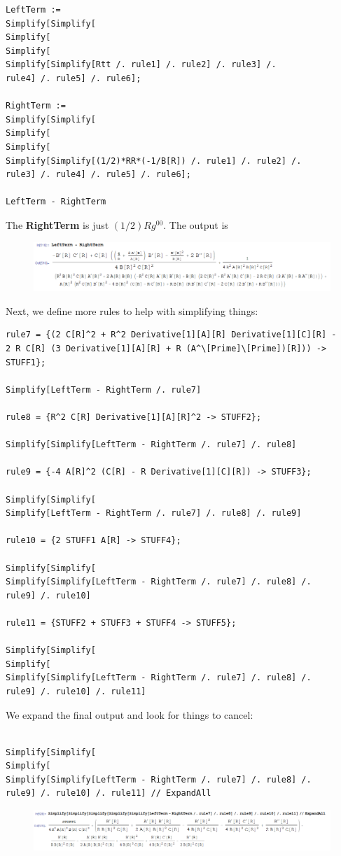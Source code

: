 \documentclass{book}
\theoremstyle{definition}
\begin{document}
\begin{lstlisting}
LeftTerm := 
Simplify[Simplify[
Simplify[
Simplify[
Simplify[Simplify[Rtt /. rule1] /. rule2] /. rule3] /. 
rule4] /. rule5] /. rule6];

RightTerm := 
Simplify[Simplify[
Simplify[
Simplify[
Simplify[Simplify[(1/2)*RR*(-1/B[R]) /. rule1] /. rule2] /. 
rule3] /. rule4] /. rule5] /. rule6];

LeftTerm - RightTerm
\end{lstlisting} 

The \textbf{RightTerm} is just $(1/2)Rg^{00}$. The output is
\begin{figure}[!htb]
	\centering
	\includegraphics[scale=0.3]{leftright}
\end{figure}

Next, we define more rules to help with simplifying things:
\begin{lstlisting}
rule7 = {(2 C[R]^2 + R^2 Derivative[1][A][R] Derivative[1][C][R] - 
2 R C[R] (3 Derivative[1][A][R] + R (A^\[Prime]\[Prime])[R])) ->
STUFF1};

Simplify[LeftTerm - RightTerm /. rule7]

rule8 = {R^2 C[R] Derivative[1][A][R]^2 -> STUFF2};

Simplify[Simplify[LeftTerm - RightTerm /. rule7] /. rule8]

rule9 = {-4 A[R]^2 (C[R] - R Derivative[1][C][R]) -> STUFF3};

Simplify[Simplify[
Simplify[LeftTerm - RightTerm /. rule7] /. rule8] /. rule9]

rule10 = {2 STUFF1 A[R] -> STUFF4};

Simplify[Simplify[
Simplify[Simplify[LeftTerm - RightTerm /. rule7] /. rule8] /. 
rule9] /. rule10]

rule11 = {STUFF2 + STUFF3 + STUFF4 -> STUFF5};

Simplify[Simplify[
Simplify[
Simplify[Simplify[LeftTerm - RightTerm /. rule7] /. rule8] /. 
rule9] /. rule10] /. rule11]
\end{lstlisting}


We expand the final output and look for things to cancel:
\begin{lstlisting}

Simplify[Simplify[
Simplify[
Simplify[Simplify[LeftTerm - RightTerm /. rule7] /. rule8] /. 
rule9] /. rule10] /. rule11] // ExpandAll

\end{lstlisting}
\begin{figure}[!htb]
	\centering
	\includegraphics[scale=0.3]{outputt}
\end{figure}
\end{document}
